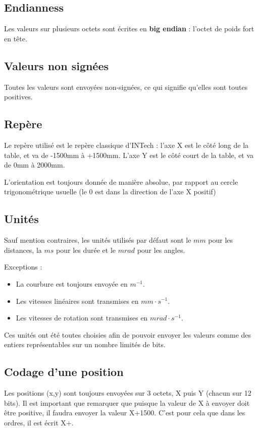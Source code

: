 \documentclass[a4paper, 12pt]{article}
\begin{document}
\subsection{Endianness}

Les valeurs sur plusieurs octets sont écrites en \textbf{big endian} : l'octet de poids fort en tête.

\subsection{Valeurs non signées}

Toutes les valeurs sont envoyées non-signées, ce qui signifie qu'elles sont toutes positives.

\subsection{Repère}

Le repère utilisé est le repère classique d'INTech : l'axe X est le côté long de la table, et va de -1500mm à +1500mm. L'axe Y est le côté court de la table, et va de 0mm à 2000mm.

L'orientation est toujours donnée de manière absolue, par rapport au cercle trigonométrique usuelle (le 0 est dans la direction de l'axe X positif)

\subsection{Unités}

Sauf mention contraires, les unités utilisés par défaut sont le $mm$ pour les distances, la $ms$ pour les durée et le $mrad$ pour les angles.

Exceptions :
\begin{itemize}
\item La courbure est toujours envoyée en $m^{-1}$.
\item Les vitesses linéaires sont transmises en $mm \cdot s^{-1}$.
\item Les vitesses de rotation sont transmises en $mrad \cdot s^{-1}$.
\end{itemize}

Ces unités ont été toutes choisies afin de pouvoir envoyer les valeurs comme des entiers représentables sur un nombre limités de bits.

\subsection{Codage d'une position}

Les positions (x,y) sont toujours envoyées sur 3 octets, X puis Y (chacun sur 12 bits). Il est important que remarquer que puisque la valeur de X à envoyer doit être positive, il faudra envoyer la valeur X+1500. C'est pour cela que dans les ordres, il est écrit X+.
\end{document}
